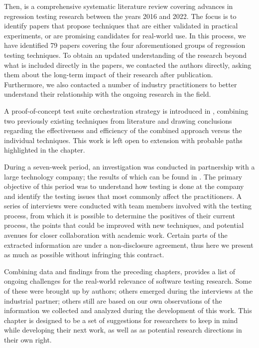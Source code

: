 Then,  is a comprehensive systematic literature review covering advances in regression testing research between the years 2016 and 2022.
The focus is to identify papers that propose techniques that are either validated in practical experiments, or are promising candidates for real-world use.
In this process, we have identified 79 papers covering the four aforementioned groups of regression testing techniques.
To obtain an updated understanding of the research beyond what is included directly in the papers, we contacted the authors directly, asking them about the long-term impact of their research after publication.
Furthermore, we also contacted a number of industry practitioners to better understand their relationship with the ongoing research in the field.

A proof-of-concept test suite orchestration strategy is introduced in , combining two previously existing techniques from literature and drawing conclusions regarding the effectiveness and efficiency of the combined approach versus the individual techniques.
This work is left open to extension with probable paths highlighted in the chapter.

During a seven-week period, an investigation was conducted in partnership with a large technology company; the results of which can be found in .
The primary objective of this period was to understand how testing is done at the company and identify the testing issues that most commonly affect the practitioners.
A series of interviews were conducted with team members involved with the testing process, from which it is possible to determine the positives of their current process, the points that could be improved with new techniques, and potential avenues for closer collaboration with academic work.
Certain parts of the extracted information are under a non-disclosure agreement, thus here we present as much as possible without infringing this contract.

Combining data and findings from the preceding chapters,  provides a list of ongoing challenges for the real-world relevance of software testing research.
Some of these were brought up by authors; others emerged during the interviews at the industrial partner; others still are based on our own observations of the information we collected and analyzed during the development of this work.
This chapter is designed to be a set of suggestions for researchers to keep in mind while developing their next work, as well as as potential research directions in their own right.

